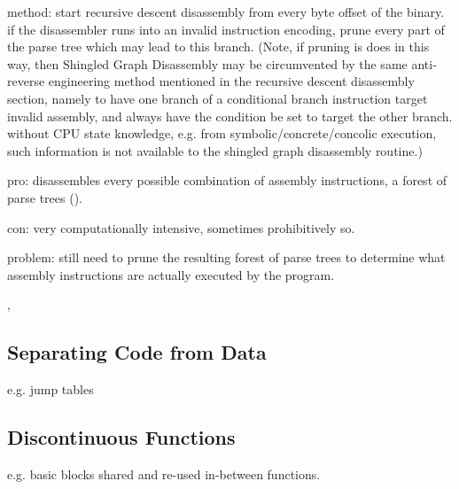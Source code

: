 method: start recursive descent disassembly from every byte offset of the binary. if the disassembler runs into an invalid instruction encoding, prune every part of the parse tree which may lead to this branch. (Note, if pruning is does in this way, then Shingled Graph Disassembly may be circumvented by the same anti-reverse engineering method mentioned in the recursive descent disassembly section, namely to have one branch of a conditional branch instruction target invalid assembly, and always have the condition be set to target the other branch. without CPU state knowledge, e.g. from symbolic/concrete/concolic execution, such information is not available to the shingled graph disassembly routine.)

pro: disassembles every possible combination of assembly instructions, a forest of parse trees ().

con: very computationally intensive, sometimes prohibitively so.

problem: still need to prune the resulting forest of parse trees to determine what assembly instructions are actually executed by the program.


\cite{singled_graph_disassembly}, \cite{superset_disassembly}


\subsection{Separating Code from Data}

e.g. jump tables




\subsection{Discontinuous Functions}

e.g. basic blocks shared and re-used in-between functions.

%
%
